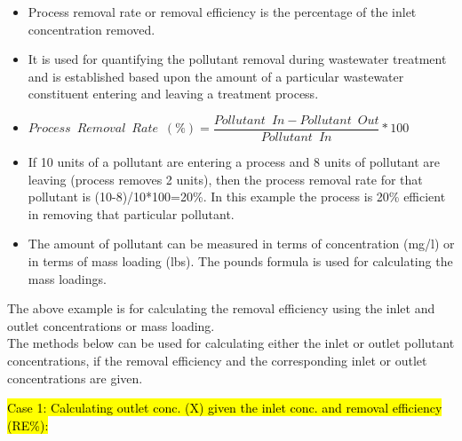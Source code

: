 \begin{itemize}
\item Process removal rate or removal efficiency is the percentage of the inlet concentration removed.  
\item It is used for quantifying the pollutant removal during wastewater treatment and is established based upon the amount of a particular wastewater constituent entering and leaving a treatment process.

\item $Process \enspace Removal \enspace Rate \enspace (\%) = \dfrac{Pollutant \enspace  In-Pollutant\enspace  Out}{Pollutant \enspace In}*100$\\

\item If 10 units of a pollutant are entering a process and 8 units of pollutant are leaving (process removes 2 units), then the process removal rate for that pollutant is (10-8)/10*100=20\%.  In this example the process is 20\% efficient in removing that particular pollutant.

\item The amount of pollutant can be measured in terms of concentration (mg/l) or in terms of mass loading (lbs).  The pounds formula is used for calculating the mass loadings.  
\end{itemize}
The above example is for calculating the removal efficiency using the inlet and outlet concentrations or mass loading.\\
The methods below can be used for calculating either the inlet or outlet pollutant concentrations, if the removal efficiency and the corresponding inlet or outlet concentrations are given. 


\hl{Case 1:  Calculating outlet conc. (X) given the inlet conc. and removal efficiency (RE\%):}

